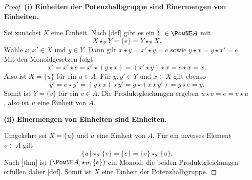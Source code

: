 \documentclass[main.tex]{subfiles}
\begin{document}
\begin{proof}
\par\medskip\noindent\textbf{(i) Einheiten der Potenzhalbgruppe sind Einermengen von Einheiten.}\par
Sei zunächst \(X\) eine Einheit.  Nach
[def] gibt es ein \(Y\in\PowNE A\) mit
\[
  X\star_{\mathcal P}Y=\{e\}
  =Y\star_{\mathcal P}X.
\]
Wähle \(x,x'\in X\) und \(y\in Y\).  Dann gilt
\(x\star y=x'\star y=e\) sowie
\(y\star x=y\star x'=e\).  Mit den Monoidgesetzen folgt
\[
  x'=x'\star e
     =x'\star(y\star x)
     =(x'\star y)\star x
     =e\star x=x.
\]
Also ist \(X=\{u\}\) für ein \(u\in A\).  Für \(y,y'\in Y\) und
\(x\in X\) gilt ebenso
\[
  y'=e\star y'
     =(y\star x)\star y'
     =y\star(x\star y')
     =y\star e=y.
\]
Somit ist \(Y=\{v\}\) für ein \(v\in A\).  Die Produktgleichungen ergeben
\(u\star v=e=v\star u\), also ist \(u\) eine Einheit von \(A\).

\par\medskip\noindent\textbf{(ii) Einermengen von Einheiten sind Einheiten.}\par
Umgekehrt sei \(X=\{u\}\) und \(u\) eine Einheit von \(A\).  Für ein
inverses Element \(v\in A\) gilt
\[
  \{u\}\star_{\mathcal P}\{v\}=\{e\}
  =\{v\}\star_{\mathcal P}\{u\}.
\]
Nach [thm] ist
\((\PowNE A,\star_{\mathcal P},\{e\})\) ein Monoid; die beiden
Produktgleichungen erfüllen daher
[def].  Somit ist \(X\) eine Einheit der
Potenzhalbgruppe.
\end{proof}

\begin{tabproof}
\end{tabproof}
\end{document}

